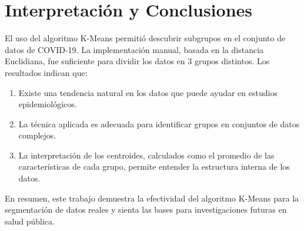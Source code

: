 \documentclass[a4paper, 10pt]{article}
\begin{document}
\section{Interpretación y Conclusiones}
El uso del algoritmo K-Means permitió descubrir subgrupos en el conjunto de datos de COVID-19. La implementación manual, basada en la distancia Euclidiana, fue suficiente para dividir los datos en 3 grupos distintos. Los resultados indican que:
\begin{enumerate}
    \item Existe una tendencia natural en los datos que puede ayudar en estudios epidemiológicos.
    \item La técnica aplicada es adecuada para identificar grupos en conjuntos de datos complejos.
    \item La interpretación de los centroides, calculados como el promedio de las características de cada grupo, permite entender la estructura interna de los datos.
\end{enumerate}
En resumen, este trabajo demuestra la efectividad del algoritmo K-Means para la segmentación de datos reales y sienta las bases para investigaciones futuras en salud pública.
\end{document}
